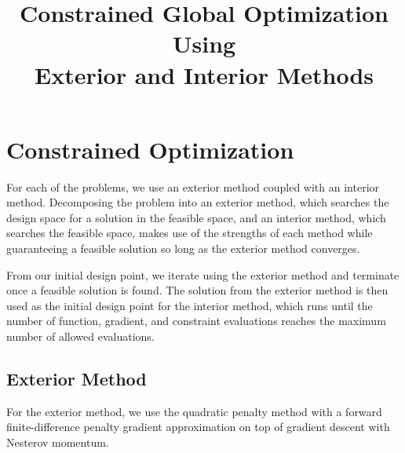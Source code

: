 \documentclass[conference]{IEEEtran}
\begin{document}
\title{\LARGE \textbf{Constrained Global Optimization Using \\ Exterior and Interior Methods} 
}


\author{
} %


\maketitle

\section{Constrained Optimization}

For each of the problems, we use an exterior method coupled with an interior method. 
Decomposing the problem into an exterior method, which searches the design space for a solution in the feasible space, and an interior method, which searches the feasible space, makes use of the strengths of each method while guaranteeing a feasible solution so long as the exterior method converges. 

From our initial design point, we iterate using the exterior method and terminate once a feasible solution is found. The solution from the exterior method is then used as the initial design point for the interior method, which runs until the number of function, gradient, and constraint evaluations reaches the maximum number of allowed evaluations.

\subsection{Exterior Method}

For the exterior method, we use the quadratic penalty method with a forward finite-difference penalty gradient approximation on top of gradient descent with Nesterov momentum.
\end{document}
